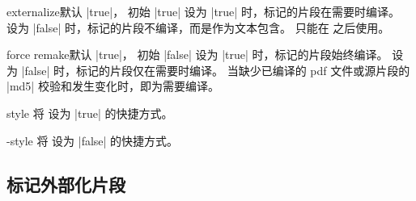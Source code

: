 \begin{extTcbKey}[][doc new=2015-03-11]{externalize}{}{默认 |true|，
  初始 |true|}
设为 |true| 时，标记的片段在需要时编译。
设为 |false| 时，标记的片段不编译，而是作为文本包含。
 只能在  之后使用。
\end{extTcbKey}

\begin{extTcbKey}[][doc new=2015-03-11]{force remake}{}{默认 |true|，
  初始 |false|}
设为 |true| 时，标记的片段始终编译。
设为 |false| 时，标记的片段仅在需要时编译。
当缺少已编译的 pdf 文件或源片段的 |md5| 校验和发生变化时，即为需要编译。
\end{extTcbKey}

\enlargethispage*{1cm}
\begin{extTcbKey}[][doc new and updated={2015-03-11}{2017-02-24}]{\tcbexclamation}{}{style}
  将  设为 |true| 的快捷方式。
\end{extTcbKey}

\begin{extTcbKey}[][doc new and updated={2015-06-12}{2017-02-24}]{-}{}{style}
  将  设为 |false| 的快捷方式。
\end{extTcbKey}


\subsection{标记外部化片段}\label{subsec:external_marking}

